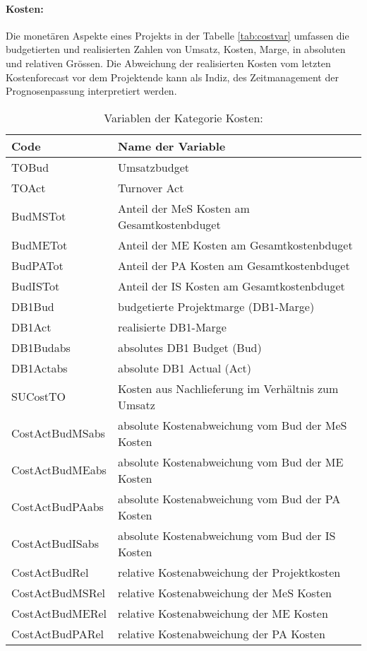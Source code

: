 \paragraph{Kosten:} Die monetären Aspekte eines Projekts in der Tabelle \ref{tab:costvar} umfassen die budgetierten und realisierten Zahlen von Umsatz, Kosten, Marge, in absoluten und relativen Grössen. Die Abweichung der realisierten Kosten vom letzten Kostenforecast vor dem Projektende kann als Indiz, des Zeitmanagement der Prognosenpassung interpretiert werden. 
\begin{table}[htbp]
	\centering
	\caption{Variablen der Kategorie Kosten:}
	\begin{tabular}{ll}
		\toprule
		\textbf{Code} & \textbf{Name der Variable} \\
		\midrule
		TOBud & Umsatzbudget \\
		TOAct & Turnover Act \\
		BudMSTot & Anteil der MeS Kosten am Gesamtkostenbduget \\
		BudMETot & Anteil der ME Kosten am Gesamtkostenbduget \\
		BudPATot & Anteil der PA Kosten am Gesamtkostenbduget \\
		BudISTot & Anteil der IS Kosten am Gesamtkostenbduget \\
		DB1Bud & budgetierte  Projektmarge (DB1-Marge) \\
		DB1Act & realisierte DB1-Marge \\
		DB1Budabs & absolutes DB1 Budget (Bud) \\
		DB1Actabs & absolute DB1 Actual (Act) \\
		SUCostTO & Kosten aus Nachlieferung im Verhältnis zum Umsatz \\
		CostActBudMSabs & absolute Kostenabweichung vom Bud der MeS Kosten \\
		CostActBudMEabs & absolute Kostenabweichung vom Bud der ME Kosten \\
		CostActBudPAabs & absolute Kostenabweichung vom Bud der PA Kosten \\
		CostActBudISabs & absolute Kostenabweichung vom Bud der IS Kosten \\
		CostActBudRel & relative Kostenabweichung  der Projektkosten \\
		CostActBudMSRel & relative Kostenabweichung der MeS Kosten \\
		CostActBudMERel & relative Kostenabweichung der ME Kosten \\
		CostActBudPARel & relative Kostenabweichung der PA Kosten \\

\end{tabular}
\end{table}
